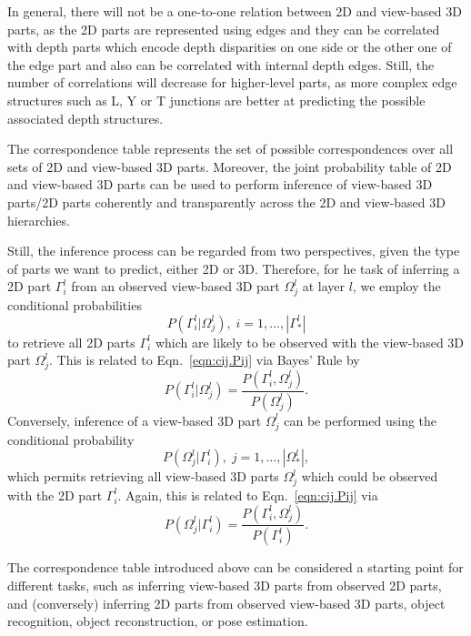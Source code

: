 \documentclass[runningheads]{llncs}
\begin{document}
In general, there will not be a one-to-one relation between 2D and view-based 3D parts, as the 2D parts are represented using edges and they can be correlated with depth parts which encode depth disparities on one side or the other one of the edge part and also can be correlated with internal depth edges. Still, the number of correlations will decrease for higher-level parts, as more complex edge structures such as L, Y or T junctions are better at predicting the possible associated depth structures.

The correspondence table represents the set of possible correspondences over all sets of 2D and view-based 3D parts.  
Moreover, the joint probability table of 2D and view-based 3D parts can be used to perform inference of view-based 3D parts/2D parts coherently and transparently across the 2D and view-based 3D hierarchies.

Still, the inference process can be regarded from two perspectives, given the type of parts we want to predict, either 2D or 3D. 
Therefore, for he task of inferring a 2D part $\Gamma_i^l$ from an observed view-based 3D part $\Omega_j^l$ at layer $l$, we employ the conditional probabilities
\begin{equation}
P(\Gamma_i^l \vert \Omega_j^l), \;i=1,\dots,|\Gamma_*^l|
\end{equation}
to retrieve all 2D parts $\Gamma_i^l$ which are likely to be observed
with the view-based 3D part $\Omega_j^l$.  This is related to
Eqn.~\ref{eqn:cij.Pij} via Bayes' Rule by
\begin{equation}
  P(\Gamma_i^l \vert \Omega_j^l)= \frac{P(\Gamma_i^l,\Omega_j^l)}{P(\Omega_j^l)}.
  \label{eqn:PGO.Bayes}
\end{equation}
Conversely, inference of a view-based 3D part $\Omega_j^l$ can be performed using the conditional probability
\begin{equation}
 P(\Omega_j^l \vert \Gamma_i^l), \;j=1,\dots,|\Omega_*^l|,
\end{equation} 
which permits retrieving all view-based 3D parts $\Omega_j^l$ which could be observed with the 2D part $\Gamma_i^l$. Again, this is related to Eqn.~\ref{eqn:cij.Pij} via
\begin{equation}
  P(\Omega_j^l \vert \Gamma_i^l)=\frac{P(\Gamma_i^l,\Omega_j^l)}{P(\Gamma_i^l)}.
  \label{eqn:POG}
\end{equation} 
 
The correspondence table introduced above can be considered a starting point for different tasks, such as inferring view-based 3D parts from observed 2D parts, and (conversely) inferring 2D parts from observed view-based 3D parts, object recognition, object reconstruction, or pose estimation. 
\end{document}
